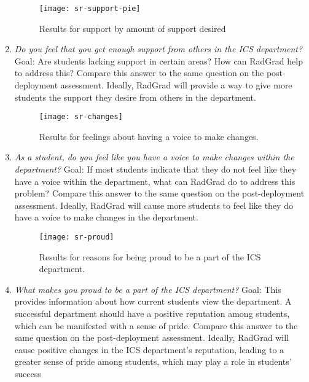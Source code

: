 \begin{enumerate}
\begin{figure}[h]
\centering
\texttt{[image: sr-support-pie]}
\caption{Results for support by amount of support desired}
\end{figure}
\item \textit{Do you feel that you get enough support from others in the ICS department?}
Goal: Are students lacking support in certain areas? How can RadGrad help to address this? Compare this answer to the same question on the post-deployment assessment. Ideally, RadGrad will provide a way to give more students the support they desire from others in the department. 
\begin{figure}[h]
\centering
\texttt{[image: sr-changes]}
\caption{Results for feelings about having a voice to make changes.}
\end{figure}
\item \textit{As a student, do you feel like you have a voice to make changes within the department?}
Goal: If most students indicate that they do not feel like they have a voice within the department, what can RadGrad do to address this problem? Compare this answer to the same question on the post-deployment assessment. Ideally, RadGrad will cause more students to feel like they do have a voice to make changes in the department.
\begin{figure}[h]
\centering
\texttt{[image: sr-proud]}
\caption{Results for reasons for being proud to be a part of the ICS department.}
\end{figure}
\item \textit{What makes you proud to be a part of the ICS department?}
Goal: This provides information about how current students view the department. A successful department should have a positive reputation among students, which can be manifested with a sense of pride. Compare this answer to the same question on the post-deployment assessment. Ideally, RadGrad will cause positive changes in the ICS department's reputation, leading to a greater sense of pride among students, which may play a role in students' success
\end{enumerate}

